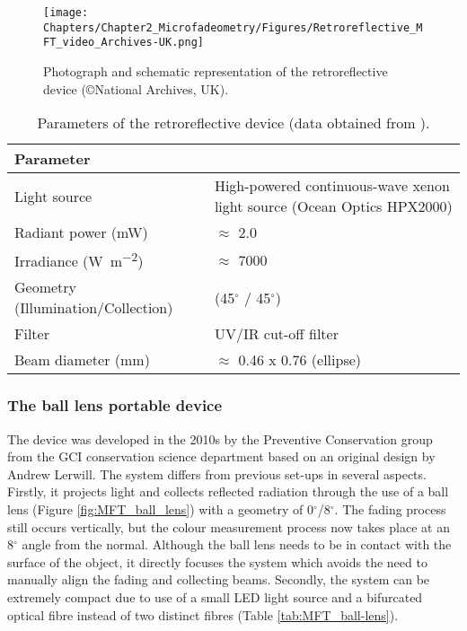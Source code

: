 \begin{figure*}[!h]
\centering
\texttt{[image: Chapters/Chapter2\_Microfadeometry/Figures/Retroreflective\_MFT\_video\_Archives-UK.png]}
\caption[\hspace{0.3cm}The retroreflective device]{Photograph and schematic representation of the retroreflective device (\copyright National Archives, \gls{UK}).}
\label{fig:MFT_retroreflective}
\end{figure*}



\begin{table*}[!h]
\centering %
\caption[\hspace{0.3cm}Parameters of the retroreflective device]{Parameters of the retroreflective device (data obtained from \cite{liang_development_2011}).}
\begin{tabular}{R{5.5cm}L{7cm}}
\toprule[0.4mm]
\textbf{Parameter} &  \\\midrule
Light source & High-powered continuous-wave xenon light source (Ocean Optics HPX2000)\\
Radiant power (\unit{\milli\watt}) & $\approx$ 2.0 \\
Irradiance (\unit{\watt\per\square\metre}) & $\approx$ 7000 \\
Geometry (Illumination/Collection) & (45$^\circ$ / 45$^\circ$) \\
Filter & UV/IR cut-off filter \\
Beam diameter (\unit{\mm}) & $\approx$ 0.46 x 0.76 (ellipse)\\
\bottomrule[0.4mm]
\end{tabular}
\label{tab:MFT_retroreflective}
\end{table*}




\subsubsection{The ball lens portable device}

The device was developed in the 2010s by the Preventive Conservation group from the GCI conservation science department \citep{pesme_development_2016} based on an original design by Andrew Lerwill. The system differs from previous set-ups in several aspects. Firstly, it projects light and collects reflected radiation through the use of a ball lens (Figure \ref{fig:MFT_ball_lens}) with a geometry of 0$^\circ$/8$^\circ$. The fading process still occurs vertically, but the colour measurement process now takes place at an 8$^\circ$ angle from the normal. Although the ball lens needs to be in contact with the surface of the object, it directly focuses the system which avoids the need to manually align the fading and collecting beams. Secondly, the system can be extremely compact due to use of a small \gls{LED} light source and a bifurcated optical fibre instead of two distinct fibres (Table \ref{tab:MFT_ball-lens}).\\

